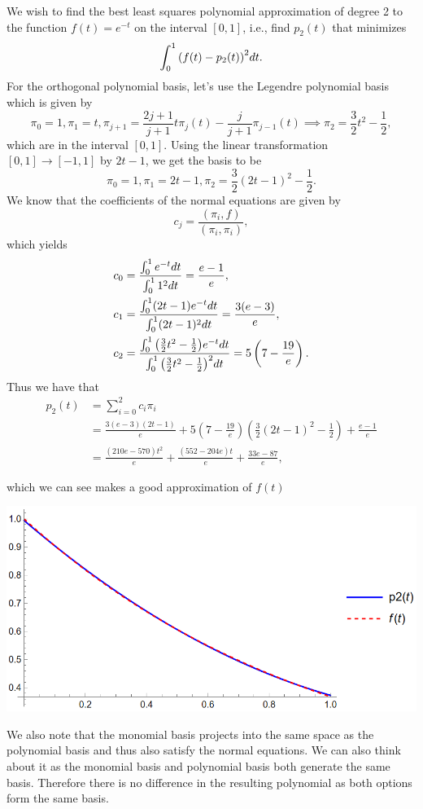 \documentclass[12pt]{report}
\begin{document}
\begin{solution}
    
    \noindent
    We wish to find the best least squares polynomial approximation of degree 2 to the function $f(t) = e^{-t}$ on the interval $[0, 1]$, i.e., find $p_2(t)$ that minimizes
    \[ 
        \int_0^1 {\left(f(t) - p_2(t)\right)}^2dt.
    \]
    For the orthogonal polynomial basis, let's use the Legendre polynomial basis which is given by
    \[ 
        \pi_0 = 1, \pi_1 = t, \pi_{j+1} = \frac{2j + 1}{j+1}t\pi_j(t) - \frac{j}{j+1}\pi_{j-1}(t) \implies \pi_2 = \frac{3}{2}t^2 - \frac{1}{2},
    \]
    which are in the interval $[0,1]$. Using the linear transformation $[0,1] \rightarrow [-1,1]$ by $2t - 1$, we get the basis to be
    \[ 
        \pi_0 = 1, \pi_1 = 2t-1, \pi_2 = \frac{3}{2}(2t - 1)^2 -\frac{1}{2}.
    \] 
    We know that the coefficients of the normal equations are given by
    \[ 
        c_j = \frac{(\pi_i,f)}{(\pi_i,\pi_i)},
    \]
    which yields
    \begin{align*}
        c_0 &= \frac{\int_0^1 e^{-t} dt}{\int_0^1 1^2 dt} = \frac{e-1}{e},\\
        c_1 &= \frac{\int_0^1 (2t - 1) e^{-t} dt}{\int_0^1 (2t - 1)^2 dt} = \frac{3 (e-3)}{e}, \\
        c_2 &= \frac{\int_0^1 {\left(\frac{3}{2}t^2 - \frac{1}{2}\right)} e^{-t} dt}{\int_0^1 {\left(\frac{3}{2}t^2 - \frac{1}{2}\right)}^2 dt} = 5 \left(7-\frac{19}{e}\right).
    \end{align*}
    Thus we have that
    \begin{align*}
        p_2(t) &= \sum_{i=0}^2c_i\pi_i\\ 
        &= \frac{3 (e-3) (2 t-1)}{e}+5 \left(7-\frac{19}{e}\right) \left(\frac{3}{2} (2 t-1)^2-\frac{1}{2}\right)+\frac{e-1}{e}\\
        &=  \frac{(210 e-570) t^2}{e}+\frac{(552-204 e) t}{e}+\frac{33 e-87}{e},        
    \end{align*} 

    which we can see makes a good approximation of $f(t)$
    \begin{center}
        \includegraphics[width=.8\textwidth]{plots/Q1.PNG}
    \end{center}
    We also note that the monomial basis projects into the same space as the polynomial basis and thus also satisfy the normal equations. We can also think about it as the monomial basis and polynomial basis both generate the same basis. Therefore there is no difference in the resulting polynomial as both options form the same basis. 


\end{solution}
\end{document}
